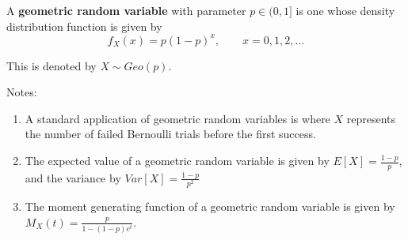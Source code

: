 \documentclass[12pt]{article}
\begin{document}
A \textbf{geometric random variable} with parameter $p\in(0,1]$ is one whose density distribution function is given by
\begin{equation*}
f_X(x) = p(1-p)^x,\qquad x=0,1,2,\dotsc
\end{equation*}

This is denoted by $X\sim Geo(p)$.

Notes:
\begin{enumerate}
\item A standard application of geometric random variables is where $X$ represents the number of failed Bernoulli trials before the first success.
\item The expected value of a geometric random variable is given by $E[X] = \frac{1-p}{p}$, and the variance by $Var[X] = \frac{1-p}{p^2}$
\item The moment generating function of a geometric random variable is given by $M_X(t) = \frac{p}{1 - (1-p)e^t}$.

\end{enumerate}
\end{document}
